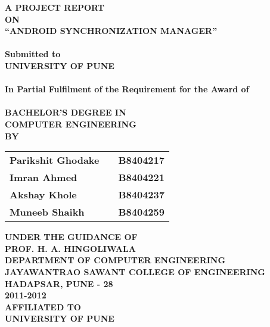 \newpage
\begin{center}
\thispagestyle{empty}
\Large{\textbf{A PROJECT REPORT\\ \large{ON}}}\\[0.7cm]
\LARGE{\textsc {\textbf{``ANDROID SYNCHRONIZATION MANAGER''}}}\\[0.5cm]
\vspace{0.5cm}
\Large{\textbf{\\Submitted to}}
\LARGE{\textbf{\\UNIVERSITY OF PUNE\\}}
\vspace{1cm}
\Large{\textbf{\\In Partial Fulfilment of the Requirement for the Award of\\}}
\Large{\textbf{\\BACHELOR'S DEGREE IN\\COMPUTER ENGINEERING}}
\vspace{1cm}
\Large{\textbf{\\BY}}\\[0.5cm]
\begin{table}[h]
\centering
\Large{
\begin{tabular}{>{\bfseries}lc>{\bfseries}r}
Parikshit Ghodake & & B8404217\\Imran Ahmed & & B8404221\\Akshay Khole & & B8404237\\Muneeb Shaikh & & B8404259\\
\end{tabular}}
\end{table}
\vspace{0.5cm}
\large{\textbf{UNDER THE GUIDANCE OF}}\\
\large{\textbf{PROF. H. A. HINGOLIWALA}}\\
\vspace{1cm}
\large{\textbf{DEPARTMENT OF COMPUTER ENGINEERING}}\\
\Large{\textbf{JAYAWANTRAO SAWANT COLLEGE OF ENGINEERING}}\\
\large{\textbf{HADAPSAR, PUNE - 28}}
\large{\textbf{\\2011-2012}}\\
\vspace{1cm}
\Large{\textbf{AFFILIATED TO\\}}
\LARGE{\textbf{UNIVERSITY OF PUNE}}
\newpage
\end{center}